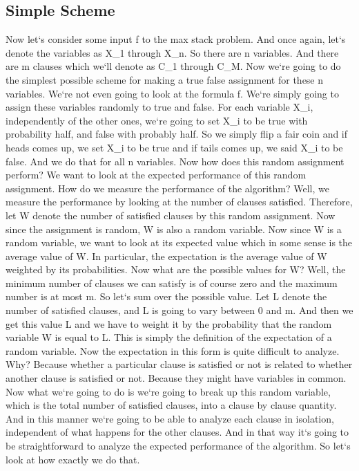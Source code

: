 \subsection{Simple Scheme}
Now let`s consider some input f to the max stack problem.
And once again, let`s denote the variables as X\_1 through X\_n.
So there are n variables.
And there are m clauses which we`ll denote as C\_1 through C\_M\@.
Now we`re going to do the simplest possible scheme for making a true false assignment for these n variables.
We`re not even going to look at the formula f.
We`re simply going to assign these variables randomly to true and false.
For each variable X\_i, independently of the other ones, we`re going to set X\_i to be true with probability half, and false with probably half.
So we simply flip a fair coin and if heads comes up, we set X\_i to be true and if tails comes up, we said X\_i to be false.
And we do that for all n variables.
Now how does this random assignment perform? We want to look at the expected performance of this random assignment.
How do we measure the performance of the algorithm? Well, we measure the performance by looking at the number of clauses satisfied.
Therefore, let W denote the number of satisfied clauses by this random assignment.
Now since the assignment is random, W is also a random variable.
Now since W is a random variable, we want to look at its expected value which in some sense is the average value of W\@.
In particular, the expectation is the average value of W weighted by its probabilities.
Now what are the possible values for W? Well, the minimum number of clauses we can satisfy is of course zero and the maximum number is at most m.
So let`s sum over the possible value.
Let L denote the number of satisfied clauses, and L is going to vary between 0 and m.
And then we get this value L and we have to weight it by the probability that the random variable W is equal to L\@.
This is simply the definition of the expectation of a random variable.
Now the expectation in this form is quite difficult to analyze.
Why? Because whether a particular clause is satisfied or not is related to whether another clause is satisfied or not.
Because they might have variables in common.
Now what we`re going to do is we`re going to break up this random variable, which is the total number of satisfied clauses, into a clause by clause quantity.
And in this manner we`re going to be able to analyze each clause in isolation, independent of what happens for the other clauses.
And in that way it`s going to be straightforward to analyze the expected performance of the algorithm.
So let`s look at how exactly we do that.

